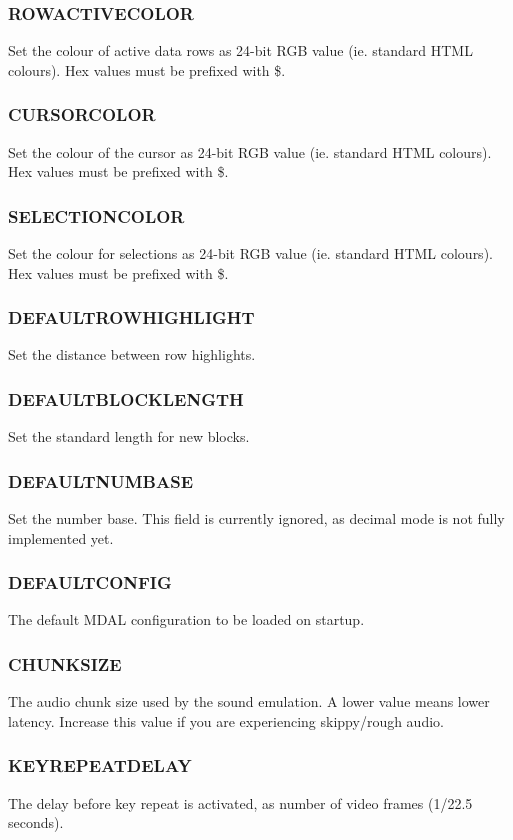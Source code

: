 \documentclass[12pt]{report}	%
\begin{document}
\subsubsection{ROWACTIVECOLOR}
Set the colour of active data rows as 24-bit RGB value (ie. standard HTML colours). Hex values must be prefixed with \$.

\subsubsection{CURSORCOLOR}
Set the colour of the cursor as 24-bit RGB value (ie. standard HTML colours). Hex values must be prefixed with \$.

\subsubsection{SELECTIONCOLOR}
Set the colour for selections as 24-bit RGB value (ie. standard HTML colours). Hex values must be prefixed with \$.

\subsubsection{DEFAULTROWHIGHLIGHT}
Set the distance between row highlights.

\subsubsection{DEFAULTBLOCKLENGTH}
Set the standard length for new blocks.

\subsubsection{DEFAULTNUMBASE}
Set the number base. This field is currently ignored, as decimal mode is not fully implemented yet.

\subsubsection{DEFAULTCONFIG}
The default MDAL configuration to be loaded on startup.

\subsubsection{CHUNKSIZE}
The audio chunk size used by the sound emulation. A lower value means lower latency. Increase this value if you are experiencing skippy/rough audio.

\subsubsection{KEYREPEATDELAY}
The delay before key repeat is activated, as number of video frames (1/22.5 seconds).
\end{document}
